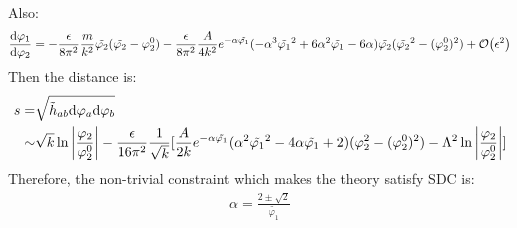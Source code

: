 Also:
\begin{align}
    \dv{\varphi_{1}}{\varphi_{2}} = -\frac{\epsilon}{8\pi^{2}}\frac{m}{k^{2}}\tilde{\varphi_{2}} (\tilde{\varphi_{2}} - \varphi_{2}^{0}) - \frac{\epsilon}{8\pi^{2}}\frac{A}{4k^{2}}e^{-\alpha\tilde{\varphi_{1}}}(-\alpha^{3} \tilde{\varphi_{1}}^{2} + 6\alpha^{2} \tilde{\varphi_{1}} - 6\alpha)\tilde{\varphi_{2}} (\tilde{\varphi_{2}}^{2} - (\varphi_{2}^{0})^{2}) + \order{\epsilon^{2}}
\end{align}
Then the distance is:
\begin{align}
    \begin{split}
        s =& \sqrt{\tilde{h}_{ab} \dd \varphi_{a} \dd \varphi_{b}} \\
        \sim & \sqrt{k} \ln \abs{\frac{\varphi_{2}}{\varphi_{2}^{0}}} -\frac{\epsilon}{16\pi^{2}}\frac{1}{\sqrt{k}}[ \frac{A}{2k}e^{-\alpha \tilde{\varphi_{1}}}(\alpha^{2}\tilde{\varphi_{1}}^{2} - 4\alpha\tilde{\varphi_{1}}+2) (\varphi_{2}^{2} - (\varphi_{2}^{0})^{2}) -\Lambda^{2} \ln \abs{\frac{\varphi_{2}}{\varphi_{2}^{0}}} ]
    \end{split}
\end{align}
Therefore, the non-trivial constraint which makes the theory satisfy SDC is:
\begin{align}
    \alpha = \frac{2\pm \sqrt{2}}{\tilde{\varphi_{1}}}
\end{align}